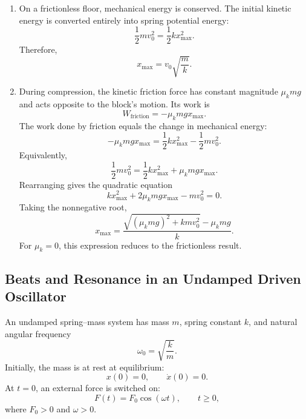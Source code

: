 \documentclass[12pt]{article}
\begin{document}
\begin{enumerate}
    \item[(a)] On a frictionless floor, mechanical energy is conserved.
    The initial kinetic energy is converted entirely into spring
    potential energy:
    \begin{equation}
        \frac{1}{2}mv_0^2 = \frac{1}{2}kx_{\max}^2.
    \end{equation}
    Therefore,
    \begin{equation}
        \boxed{x_{\max} = v_0\sqrt{\frac{m}{k}}}.
    \end{equation}

    \item[(b)] During compression, the kinetic friction force has
    constant magnitude $\mu_k mg$ and acts opposite to the block's
    motion. Its work is
    \begin{equation}
        W_{\mathrm{friction}} = -\mu_k mgx_{\max}.
    \end{equation}
    The work done by friction equals the change in mechanical energy:
    \begin{equation}
        -\mu_k mgx_{\max}
        = \frac{1}{2}kx_{\max}^2 - \frac{1}{2}mv_0^2.
    \end{equation}
    Equivalently,
    \begin{equation}
        \frac{1}{2}mv_0^2
        = \frac{1}{2}kx_{\max}^2 + \mu_k mgx_{\max}.
    \end{equation}
    Rearranging gives the quadratic equation
    \begin{equation}
        kx_{\max}^2 + 2\mu_k mgx_{\max} - mv_0^2 = 0.
    \end{equation}
    Taking the nonnegative root,
    \begin{equation}
        \boxed{
            x_{\max}
            = \frac{\sqrt{(\mu_k mg)^2 + kmv_0^2} - \mu_k mg}{k}
        }.
    \end{equation}
    For $\mu_k=0$, this expression reduces to the frictionless result.
\end{enumerate}


\subsection{Beats and Resonance in an Undamped Driven Oscillator}

An undamped spring--mass system has mass $m$, spring constant $k$,
and natural angular frequency
\begin{equation}
    \omega_0=\sqrt{\frac{k}{m}}.
\end{equation}
Initially, the mass is at rest at equilibrium:
\begin{equation}
    x(0)=0,
    \qquad
    \dot{x}(0)=0.
\end{equation}
At $t=0$, an external force is switched on:
\begin{equation}
    F(t)=F_0\cos(\omega t),
    \qquad t\geq0,
\end{equation}
where $F_0>0$ and $\omega>0$.
\end{document}

